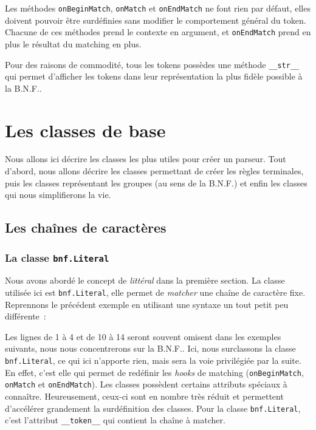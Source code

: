 \documentclass[a4paper]{article}
\newcommand{\fixed}[1]{\texttt{#1}}
\newcommand{\bnf}{B.N.F.}
\begin{document}
            \noindent
            Les méthodes \fixed{onBeginMatch}, \fixed{onMatch} et
            \fixed{onEndMatch} ne font rien par défaut, elles doivent pouvoir être
            surdéfinies sans modifier le comportement général du token. Chacune
            de ces méthodes prend le contexte en argument, et \fixed{onEndMatch}
            prend en plus le résultat du matching en plus.

            Pour des raisons de commodité, tous les tokens possèdes une méthode
            \fixed{\_\_str\_\_} qui permet d'afficher les tokens dans leur
            représentation la plus fidèle possible à la \bnf.

    \newpage
    \section{Les classes de base}
        Nous allons ici décrire les classes les plus utiles pour créer un parseur.
        Tout d'abord, nous allons décrire les classes permettant de créer les
        règles terminales, puis les classes représentant les groupes (au sens de
        la \bnf) et enfin les classes qui nous simplifierons la vie.

        \subsection{Les chaînes de caractères}

            \subsubsection{La classe \fixed{bnf.Literal}}
                Nous avons abordé le concept de \emph{littéral} dans la première
                section. La classe utilisée ici est \fixed{bnf.Literal}, elle permet
                de \emph{matcher} une chaîne de caractère fixe. Reprennons le précédent
                exemple en utilisant une syntaxe un tout petit peu différente~:

                Les lignes de 1 à 4 et de 10 à 14 seront souvent omisent dans les exemples suivants,
                nous nous concentrerons sur la \bnf. Ici, nous surclassons la
                classe \fixed{bnf.Literal}, ce qui ici n'apporte rien, mais sera
                la voie privilégiée par la suite. En effet, c'est elle
                qui permet de redéfinir les \emph{hooks} de matching
                (\fixed{onBeginMatch}, \fixed{onMatch} et \fixed{onEndMatch}).
                Les classes possèdent certains attributs spéciaux à connaître.
                Heureusement, ceux-ci sont en nombre très réduit et permettent
                d'accélérer grandement la surdéfinition des classes. Pour la classe
                \fixed{bnf.Literal}, c'est l'attribut \fixed{\_\_token\_\_} qui
                contient la chaîne à matcher.
\end{document}
